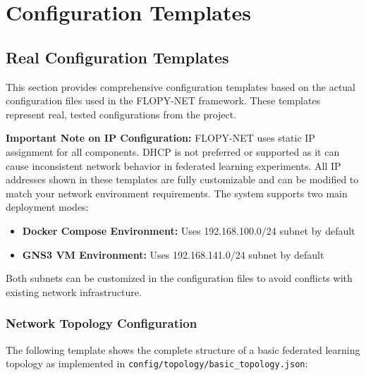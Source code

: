 \section{Configuration Templates}
\label{appendix:configuration-templates}

\subsection{Real Configuration Templates}

This section provides comprehensive configuration templates based on the actual configuration files used in the FLOPY-NET framework. These templates represent real, tested configurations from the project.

\textbf{Important Note on IP Configuration:} FLOPY-NET uses static IP assignment for all components. DHCP is not preferred or supported as it can cause inconsistent network behavior in federated learning experiments. All IP addresses shown in these templates are fully customizable and can be modified to match your network environment requirements. The system supports two main deployment modes:

\begin{itemize}
\item \textbf{Docker Compose Environment:} Uses 192.168.100.0/24 subnet by default
\item \textbf{GNS3 VM Environment:} Uses 192.168.141.0/24 subnet by default
\end{itemize}

Both subnets can be customized in the configuration files to avoid conflicts with existing network infrastructure.

\subsubsection{Network Topology Configuration}

The following template shows the complete structure of a basic federated learning topology as implemented in \texttt{config/topology/basic\_topology.json}:

